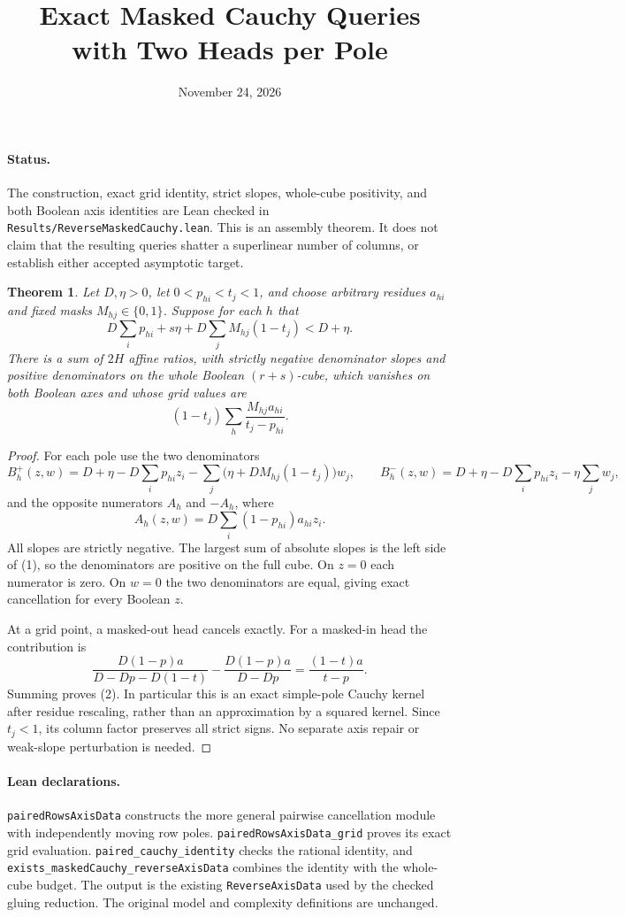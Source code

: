 \documentclass[11pt]{article}
\title{Exact Masked Cauchy Queries with Two Heads per Pole}
\author{}
\date{November 24, 2026}
\newtheorem{theorem}{Theorem}
\begin{document}
\maketitle

\paragraph{Status.}
The construction, exact grid identity, strict slopes, whole-cube positivity,
and both Boolean axis identities are Lean checked in
\texttt{Results/ReverseMaskedCauchy.lean}. This is an assembly theorem.
It does not claim that the resulting queries shatter a superlinear number
of columns, or establish either accepted asymptotic target.

\begin{theorem}
Let $D,\eta>0$, let $0<p_{hi}<t_j<1$, and choose arbitrary residues
$a_{hi}$ and fixed masks $M_{hj}\in\{0,1\}$. Suppose for each $h$ that
\[
 D\sum_i p_{hi}+s\eta+D\sum_jM_{hj}(1-t_j)<D+\eta.
 \tag{1}
\]
There is a sum of $2H$ affine ratios, with strictly negative denominator
slopes and positive denominators on the whole Boolean $(r+s)$-cube,
which vanishes on both Boolean axes and whose grid values are
\[
 (1-t_j)\sum_h\frac{M_{hj}a_{hi}}{t_j-p_{hi}}.
 \tag{2}
\]
\end{theorem}
\begin{proof}
For each pole use the two denominators
\[
 B_h^+(z,w)=D+\eta-D\sum_i p_{hi}z_i
       -\sum_j\bigl(\eta+DM_{hj}(1-t_j)\bigr)w_j,
 \qquad
 B_h^-(z,w)=D+\eta-D\sum_i p_{hi}z_i-\eta\sum_jw_j,
\]
and the opposite numerators $A_h$ and $-A_h$, where
\[
 A_h(z,w)=D\sum_i(1-p_{hi})a_{hi}z_i.
\]
All slopes are strictly negative. The largest sum of absolute slopes is
the left side of (1), so the denominators are positive on the full cube.
On $z=0$ each numerator is zero. On $w=0$ the two denominators are
equal, giving exact cancellation for every Boolean $z$.

At a grid point, a masked-out head cancels exactly. For a masked-in head
the contribution is
\[
 \frac{D(1-p)a}{D-Dp-D(1-t)}-
 \frac{D(1-p)a}{D-Dp}
 =\frac{(1-t)a}{t-p}.
\]
Summing proves (2). In particular this is an exact simple-pole Cauchy
kernel after residue rescaling, rather than an approximation by a
squared kernel. Since $t_j<1$, its column factor preserves all strict
signs. No separate axis repair or weak-slope perturbation is needed.
\end{proof}

\paragraph{Lean declarations.}
\texttt{pairedRowsAxisData} constructs the more general pairwise
cancellation module with independently moving row poles.
\texttt{pairedRowsAxisData\_grid} proves its exact grid evaluation.
\texttt{paired\_cauchy\_identity} checks the rational identity, and
\texttt{exists\_maskedCauchy\_reverseAxisData} combines the identity
with the whole-cube budget. The output is the existing
\texttt{ReverseAxisData} used by the checked gluing reduction.
The original model and complexity definitions are unchanged.
\end{document}
